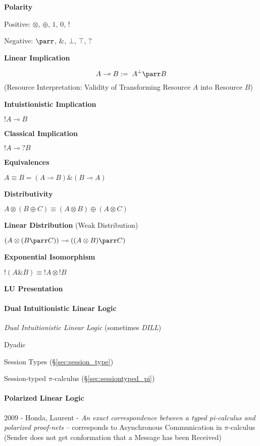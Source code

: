 \textbf{Polarity}

Positive: $\otimes$, $\oplus$, $1$, $0$, $!$

Negative: $\parr$, $\&$, $\bot$, $\top$, $?$


\textbf{Linear Implication}

\[
  A \multimap B := \; A^{\bot} \parr B
\]
(Resource Interpretation: Validity of Transforming Resource $A$ into
Resource $B$)


\textbf{Intuistionistic Implication}

$!A \multimap B$


\textbf{Classical Implication}

$!A \multimap ?B$


\textbf{Equivalences}

$A \equiv B = (A \multimap B) \& (B \multimap A)$


\textbf{Distributivity}

$A \otimes (B \oplus C) \equiv (A \otimes B) \oplus (A \otimes C)$


\textbf{Linear Distribution} (Weak Distribution)

$(A \otimes (B \parr C)) \multimap ((A \otimes B) \parr C)$


\textbf{Exponential Isomorphism}

$!(A \& B) \equiv !A \otimes !B$


\textbf{LU Presentation}



\paragraph{Dual Intuitionistic Linear Logic}\hfill
\label{sec:dual_linear_logic}

\cite{andreoli92}

\emph{Dual Intuitionistic Linear Logic} (sometimes \emph{DILL})

Dyadic

Session Types (\S\ref{sec:session_type})

Session-typed $\pi$-calculus (\S\ref{sec:sessiontyped_pi})



\paragraph{Polarized Linear Logic}\label{sec:polarized_linear_logic}\hfill

2009 - Honda, Laurent - \emph{An exact correspondence between a typed
  pi-calculus and polarized proof-nets} -- corresponds to Asynchronous
Communication in $\pi$-calculus (Sender does not get conformation that a
Message has been Received)



